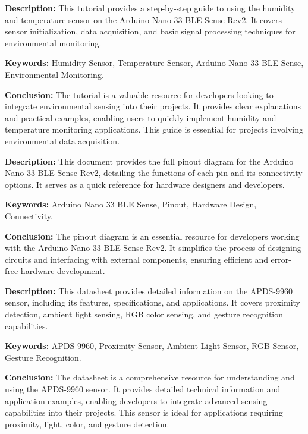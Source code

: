 {
	\textbf{Description:} This tutorial provides a step-by-step guide to using the humidity and temperature sensor on the Arduino Nano 33 BLE Sense Rev2. It covers sensor initialization, data acquisition, and basic signal processing techniques for environmental monitoring.
	\newline
	
	\textbf{Keywords:} Humidity Sensor, Temperature Sensor, Arduino Nano 33 BLE Sense, Environmental Monitoring.
	
	\newpage
	\textbf{Conclusion:} The tutorial is a valuable resource for developers looking to integrate environmental sensing into their projects. It provides clear explanations and practical examples, enabling users to quickly implement humidity and temperature monitoring applications. This guide is essential for projects involving environmental data acquisition\cite{Arduino:2024i}.
}

{
	\textbf{Description:} This document provides the full pinout diagram for the Arduino Nano 33 BLE Sense Rev2, detailing the functions of each pin and its connectivity options. It serves as a quick reference for hardware designers and developers.
	\newline
	
	\textbf{Keywords:} Arduino Nano 33 BLE Sense, Pinout, Hardware Design, Connectivity.
	
	\newpage
	\textbf{Conclusion:} The pinout diagram is an essential resource for developers working with the Arduino Nano 33 BLE Sense Rev2. It simplifies the process of designing circuits and interfacing with external components, ensuring efficient and error-free hardware development\cite{Arduino:2024p}.
}

{
	\textbf{Description:} This datasheet provides detailed information on the APDS-9960 sensor, including its features, specifications, and applications. It covers proximity detection, ambient light sensing, RGB color sensing, and gesture recognition capabilities.
	\newline
	
	\textbf{Keywords:} APDS-9960, Proximity Sensor, Ambient Light Sensor, RGB Sensor, Gesture Recognition.
	
	\newpage
	\textbf{Conclusion:} The datasheet is a comprehensive resource for understanding and using the APDS-9960 sensor. It provides detailed technical information and application examples, enabling developers to integrate advanced sensing capabilities into their projects. This sensor is ideal for applications requiring proximity, light, color, and gesture detection\cite{Ava15}.
}

